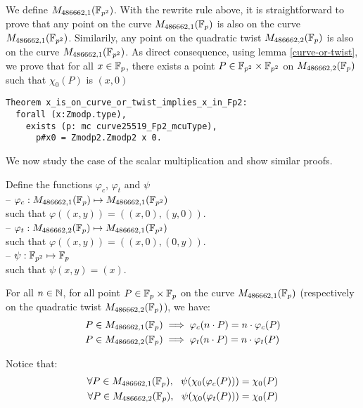 We define $M_{486662,1}(\mathbb{F}_{p^2})$. With the rewrite rule above, it is straightforward to prove that any point on the curve $M_{486662,1}(\mathbb{F}_{p})$ is also on the curve $M_{486662,1}(\mathbb{F}_{p^2})$. Similarily, any point on the quadratic twist $M_{486662,2}(\mathbb{F}_{p})$ is also on the curve $M_{486662,1}(\mathbb{F}_{p^2})$.
As direct consequence, using lemma \ref{curve-or-twist}, we prove that for all $x \in \mathbb{F}_{p}$, there exists a point $P \in \mathbb{F}_{p^2}\times\mathbb{F}_{p^2}$ on $M_{486662,2}(\mathbb{F}_{p})$ such that $\chi_0(P)$ is $(x,0)$

\begin{lstlisting}[language=Coq]
Theorem x_is_on_curve_or_twist_implies_x_in_Fp2:
  forall (x:Zmodp.type),
    exists (p: mc curve25519_Fp2_mcuType),
      p#x0 = Zmodp2.Zmodp2 x 0.
\end{lstlisting}

We now study the case of the scalar multiplication and show similar proofs.
\begin{definition}
Define the functions $\varphi_c$, $\varphi_t$ and $\psi$\\
-- $\varphi_c: M_{486662,1}(\mathbb{F}_{p}) \mapsto M_{486662,1}(\mathbb{F}_{p^2})$\\
  such that $\varphi((x,y)) = ((x,0), (y,0))$.\\
-- $\varphi_t: M_{486662,2}(\mathbb{F}_{p}) \mapsto M_{486662,1}(\mathbb{F}_{p^2})$\\
  such that $\varphi((x,y)) = ((x,0), (0,y))$.\\
-- $\psi: \mathbb{F}_{p^2} \mapsto \mathbb{F}_{p}$\\
  such that $\psi(x,y) = (x)$.
\end{definition}

\begin{lemma}
For all $n \in \mathbb{N}$, for all point $P\in\mathbb{F}_{p}\times\mathbb{F}_{p}$ on the curve $M_{486662,1}(\mathbb{F}_{p})$ (respectively on the quadratic twist $M_{486662,2}(\mathbb{F}_{p})$), we have:
\begin{align*}
P \in M_{486662,1}(\mathbb{F}_{p}) &\implies \varphi_c(n \cdot P) = n \cdot \varphi_c(P)\\
P \in M_{486662,2}(\mathbb{F}_{p}) &\implies \varphi_t(n \cdot P) = n \cdot \varphi_t(P)
\end{align*}
\end{lemma}

Notice that:
\begin{align*}
\forall P \in M_{486662,1}(\mathbb{F}_{p}),\ \ \psi(\chi_0(\varphi_c(P))) = \chi_0(P)\\
\forall P \in M_{486662,2}(\mathbb{F}_{p}),\ \ \psi(\chi_0(\varphi_t(P))) = \chi_0(P)
\end{align*}


